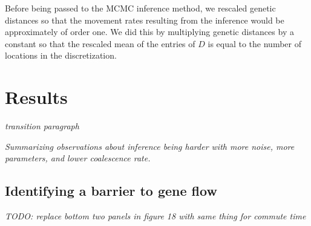\documentclass{article}
\newcommand{\plr}[1]{{\em \color{blue} #1}}
\begin{document}
Before being passed to the MCMC inference method,
we rescaled genetic distances so that the movement rates resulting from the inference
would be approximately of order one.
We did this by multiplying genetic distances by a constant
so that the rescaled mean of the entries of $D$
is equal to the number of locations in the discretization. 



\section*{Results}

\plr{transition paragraph}

\plr{Summarizing observations about inference being harder with more noise,
more parameters,
and lower coalescence rate.}

\subsection*{Identifying a barrier to gene flow}
\label{sec:5x3b}

\plr{TODO: replace bottom two panels in figure 18 with same thing for commute time}
\end{document}
